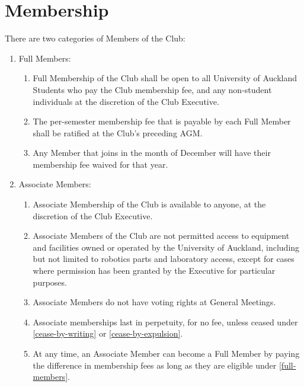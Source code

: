 \documentclass[a4paper]{article}
\begin{document}
	\section{Membership}
	There are two categories of Members of the Club:
	\begin{enumerate}
		\item \label{full-members} Full Members:
		\begin{enumerate}
			\item Full Membership of the Club shall be open to all University of Auckland Students who pay the Club membership fee, and any non-student individuals at the discretion of the Club Executive.
			
			\item The per-semester membership fee that is payable by each Full Member shall be ratified at the Club's preceding \ac{AGM}.
			
			\item Any Member that joins in the month of December will have their membership fee waived for that year.
		\end{enumerate}
	
		\item Associate Members:
		\begin{enumerate}
			\item Associate Membership of the Club is available to anyone, at the discretion of the Club Executive.
			
			\item Associate Members of the Club are not permitted access to equipment and facilities owned or operated by the University of Auckland, including but not limited to robotics parts and laboratory access, except for cases where permission has been granted by the Executive for particular purposes.
			
			\item Associate Members do not have voting rights at General Meetings.
			
			\item Associate memberships last in perpetuity, for no fee, unless ceased under \ref{cease-by-writing} or \ref{cease-by-expulsion}.
			
			\item At any time, an Associate Member can become a Full Member by paying the difference in membership fees as long as they are eligible under \ref{full-members}.
		\end{enumerate}
	\end{enumerate}
	
\end{document}
